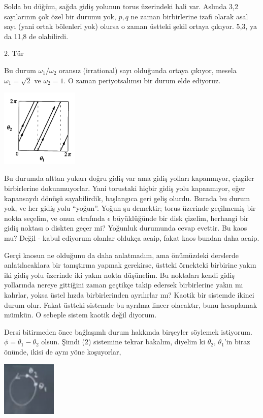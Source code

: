 \documentclass[12pt,fleqn]{article}\usepackage{../../common}
\begin{document}
Solda bu düğüm, sağda gidiş yolunun torus üzerindeki hali var. Aslında 3,2
sayılarının çok özel bir durumu yok, $p,q$ ne zaman birbirlerine izafi
olarak asal sayı (yani ortak bölenleri yok) olursa o zaman üstteki şekil
ortaya çıkıyor. 5,3, ya da 11,8 de olabilirdi.

2. Tür

Bu durum $\omega_1/\omega_2$ oransız (irrational) sayı olduğunda ortaya
çıkıyor, mesela $\omega_1 = \sqrt{2}$ ve $\omega_2 = 1$. O zaman
periyotsalımsı bir durum elde ediyoruz. 

\includegraphics[width=10em]{14_25.png}

Bu durumda alttan yukarı doğru gidiş var ama gidiş yolları kapanmıyor,
çizgiler birbirlerine dokunmuyorlar. Yani torustaki hiçbir gidiş yolu
kapanmıyor, eğer kapansaydı dönüşü sayabilirdik, başlangıca geri geliş
olurdu. Burada bu durum yok, ve her gidiş yolu ``yoğun''. Yoğun şu
demektir; torus üzerinde geçilmemiş bir nokta seçelim, ve onun etrafında
$\epsilon$ büyüklüğünde bir disk çizelim, herhangi bir gidiş noktası o
diskten geçer mi? Yoğunluk durumunda cevap evettir. Bu kaos mu? Değil -
kabul ediyorum olanlar oldukça acaip, fakat kaos bundan daha acaip. 

Gerçi kaosun ne olduğunu da daha anlatmadım, ama önümüzdeki derslerde
anlatılacaklara bir tanıştırma yapmak gerekirse, üstteki örnekteki
birbirine yakın iki gidiş yolu üzerinde iki yakın nokta düşünelim. Bu
noktaları kendi gidiş yollarında nereye gittiğini zaman geçtikçe takip
edersek birbirlerine yakın mı kalırlar, yoksa üstel hızda birbirlerinden
ayrılırlar mı? Kaotik bir sistemde ikinci durum olur. Fakat üstteki
sistemde bu ayrılma lineer olacaktır, bunu hesaplamak mümkün. O sebeple
sistem kaotik değil diyorum. 

Dersi bitirmeden önce bağlaşımlı durum hakkında birşeyler söylemek
istiyorum. $\phi = \theta_1 - \theta_2$ olsun. Şimdi (2) sistemine tekrar
bakalım, diyelim ki $\theta_2$, $\theta_1$'in biraz önünde, ikisi de aynı
yöne koşuyorlar,

\includegraphics[width=7em]{14_26.png}
\end{document}

